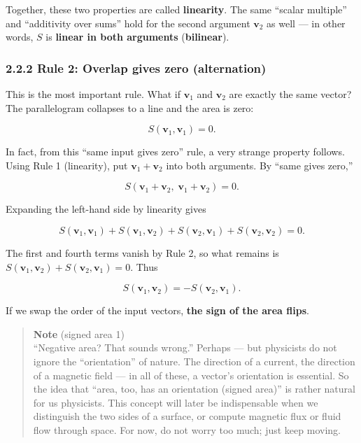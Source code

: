 \documentclass[a4paper,12pt,openany]{book}
\begin{document}
Together, these two properties are called \textbf{linearity}. The same
``scalar multiple'' and ``additivity over sums'' hold for the second
argument \(\mathbf{v}_2\) as well — in other words, \(S\) is
\textbf{linear in both arguments} (\textbf{bilinear}).

\hypertarget{rule-2-overlap-gives-zero-alternation}{%
\subsubsection{2.2.2 Rule 2: Overlap gives zero
(alternation)}\label{rule-2-overlap-gives-zero-alternation}}

This is the most important rule. What if \(\mathbf{v}_1\) and
\(\mathbf{v}_2\) are exactly the same vector? The parallelogram
collapses to a line and the area is zero:

\[S(\mathbf{v}_1,\mathbf{v}_1)=0.\]

In fact, from this ``same input gives zero'' rule, a very strange
property follows. Using Rule 1 (linearity), put
\(\mathbf{v}_1+\mathbf{v}_2\) into both arguments. By ``same gives
zero,''

\[S(\mathbf{v}_1+\mathbf{v}_2,\;\mathbf{v}_1+\mathbf{v}_2)=0.\]

Expanding the left-hand side by linearity gives

\[S(\mathbf{v}_1,\mathbf{v}_1)+S(\mathbf{v}_1,\mathbf{v}_2)+S(\mathbf{v}_2,\mathbf{v}_1)+S(\mathbf{v}_2,\mathbf{v}_2)=0.\]

The first and fourth terms vanish by Rule 2, so what remains is
\(S(\mathbf{v}_1,\mathbf{v}_2)+S(\mathbf{v}_2,\mathbf{v}_1)=0\). Thus

\[S(\mathbf{v}_1,\mathbf{v}_2)=-S(\mathbf{v}_2,\mathbf{v}_1).\]

If we swap the order of the input vectors,
\textbf{the sign of the area flips}.

\begin{quote}
\textbf{Note} (signed area 1)\\
``Negative area? That sounds wrong.'' Perhaps — but physicists do not
ignore the ``orientation'' of nature. The direction of a current, the
direction of a magnetic field — in all of these, a vector's
orientation is essential. So the idea that ``area, too, has an
orientation (signed area)'' is rather natural for us physicists. This
concept will later be indispensable when we distinguish the two sides of
a surface, or compute magnetic flux or fluid flow through space. For
now, do not worry too much; just keep moving.
\end{quote}
\end{document}
